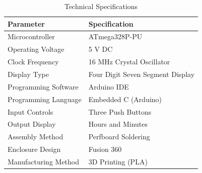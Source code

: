 \documentclass[12pt,a4paper]{article}
\begin{document}
\begin{table}[H]

\centering

\caption{Technical Specifications}

\begin{tabular}{|p{6cm}|p{7cm}|}

\hline

\textbf{Parameter} & \textbf{Specification}\\

\hline

Microcontroller & ATmega328P-PU\\

\hline

Operating Voltage & 5 V DC\\

\hline

Clock Frequency & 16 MHz Crystal Oscillator\\

\hline

Display Type & Four Digit Seven Segment Display\\

\hline

Programming Software & Arduino IDE\\

\hline

Programming Language & Embedded C (Arduino)\\

\hline

Input Controls & Three Push Buttons\\

\hline

Output Display & Hours and Minutes\\

\hline

Assembly Method & Perfboard Soldering\\

\hline

Enclosure Design & Fusion 360\\

\hline

Manufacturing Method & 3D Printing (PLA)\\

\hline

\end{tabular}

\end{table}
\end{document}
